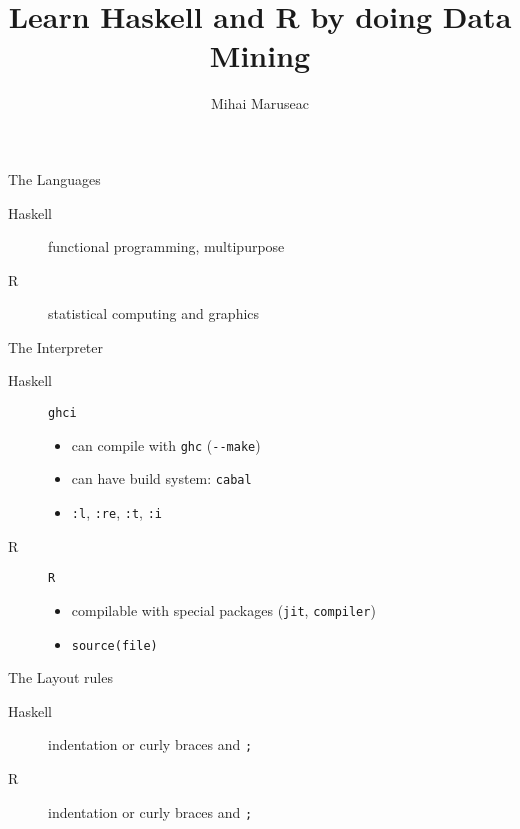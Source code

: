 \documentclass{beamer}
\title{Learn Haskell and R by doing Data Mining}
\author{Mihai Maruseac}
\begin{document}
\maketitle

\begin{frame}{The Languages}
  \begin{description}
    \item[Haskell] functional programming, multipurpose
    \item[R] statistical computing and graphics
  \end{description}
\end{frame}

\begin{frame}{The Interpreter}
  \begin{description}
    \item[Haskell] \texttt{ghci}
      \begin{itemize}
        \item can compile with \texttt{ghc} (\texttt{-{}-make})
        \item can have build system: \texttt{cabal}
        \item \texttt{:l}, \texttt{:re}, \texttt{:t}, \texttt{:i}
      \end{itemize}
    \item[R] \texttt{R}
      \begin{itemize}
        \item compilable with special packages (\texttt{jit},
          \texttt{compiler})
        \item \texttt{source(file)}
      \end{itemize}
  \end{description}
\end{frame}

\begin{frame}{The Layout rules}
  \begin{description}
    \item[Haskell] indentation or curly braces and \texttt{;}
    \item[R] indentation or curly braces and \texttt{;}
  \end{description}
\end{frame}
\end{document}
